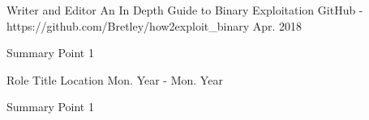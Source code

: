 

\begin{cventries}

  \cventry
    {Writer and Editor} %
    {An In Depth Guide to Binary Exploitation} %
    {GitHub - https://github.com/Bretley/how2exploit_binary} %
    {Apr. 2018} %
    {
      \begin{cvitems} %
        \item {Summary Point 1}
      \end{cvitems}
    }

  \cventry
    {Role} %
    {Title} %
    {Location} %
    {Mon. Year - Mon. Year} %
    {
      \begin{cvitems} %
        \item {Summary Point 1}
      \end{cvitems}
    }

\end{cventries}
